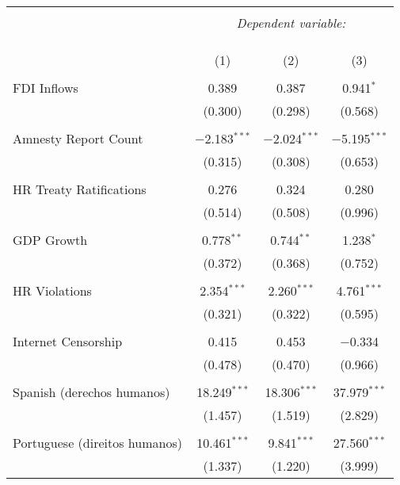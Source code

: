 
\begin{table}[!htbp] \centering 
  \caption{} 
  \label{} 
\begin{tabular}{@{\extracolsep{5pt}}lccc} 
\\[-1.8ex]\hline 
\hline \\[-1.8ex] 
 & \multicolumn{3}{c}{\textit{Dependent variable:}} \\ 
\cline{2-4} 
\\[-1.8ex] & \multicolumn{3}{c}{ } \\ 
\\[-1.8ex] & (1) & (2) & (3)\\ 
\hline \\[-1.8ex] 
 FDI Inflows & 0.389 & 0.387 & 0.941$^{*}$ \\ 
  & (0.300) & (0.298) & (0.568) \\ 
  & & & \\ 
 Amnesty Report Count & $-$2.183$^{***}$ & $-$2.024$^{***}$ & $-$5.195$^{***}$ \\ 
  & (0.315) & (0.308) & (0.653) \\ 
  & & & \\ 
 HR Treaty Ratifications & 0.276 & 0.324 & 0.280 \\ 
  & (0.514) & (0.508) & (0.996) \\ 
  & & & \\ 
 GDP Growth & 0.778$^{**}$ & 0.744$^{**}$ & 1.238$^{*}$ \\ 
  & (0.372) & (0.368) & (0.752) \\ 
  & & & \\ 
 HR Violations & 2.354$^{***}$ & 2.260$^{***}$ & 4.761$^{***}$ \\ 
  & (0.321) & (0.322) & (0.595) \\ 
  & & & \\ 
 Internet Censorship & 0.415 & 0.453 & $-$0.334 \\ 
  & (0.478) & (0.470) & (0.966) \\ 
  & & & \\ 
 Spanish (derechos humanos) & 18.249$^{***}$ & 18.306$^{***}$ & 37.979$^{***}$ \\ 
  & (1.457) & (1.519) & (2.829) \\ 
  & & & \\ 
 Portuguese (direitos humanos) & 10.461$^{***}$ & 9.841$^{***}$ & 27.560$^{***}$ \\ 
  & (1.337) & (1.220) & (3.999) \\ 

\end{tabular}
\end{table}
